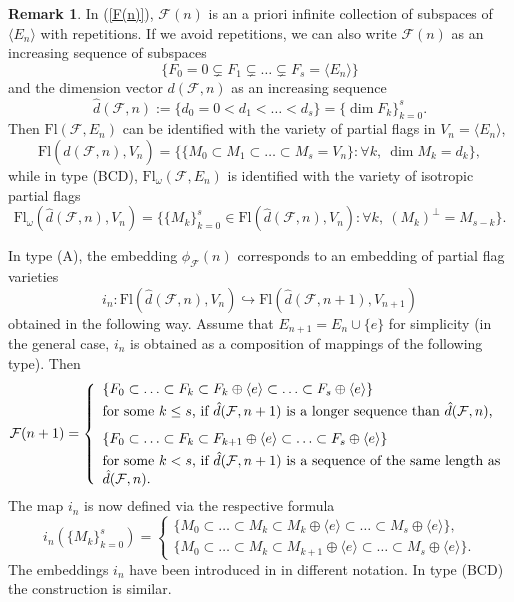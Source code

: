 \documentclass[12pt]{amsart}
\newcommand{\Ff}{\mathcal{F}}
\renewcommand{\span}[1]{\langle #1\rangle}
\newcommand{\Fl}{\mathrm{Fl}}
\numberwithin{equation}{section}
\theoremstyle{definition}
\newtheorem{remark}[theorem]{Remark}
\begin{document}
\begin{remark}
\label{R-section2.3}
In (\ref{F(n)}),
$\Ff(n)$ is an a priori infinite collection of subspaces of $\span{E_n}$ with repetitions.
If we avoid repetitions, we can also write $\Ff(n)$ as an increasing sequence of subspaces
\[
\{F_0=0\subsetneq F_1\subsetneq \ldots\subsetneq F_s=\span{E_n}\}
\]
and the dimension vector $d(\Ff,n)$ as an increasing sequence
\[
\hat{d}(\Ff,n):=\{d_0=0<d_1<\ldots<d_s\}=\{\dim F_k\}_{k=0}^s.
\]
Then $\Fl(\Ff,E_n)$ can be identified with the variety of partial flags in $V_n=\span{E_n}$,
\[
\Fl(\hat{d}(\Ff,n),V_n)=\big\{
\{M_0\subset M_1\subset \ldots\subset M_s=V_n\}:\forall k,\ \dim M_k=d_k
\big\},
\]
while in type (BCD), $\Fl_\omega(\Ff,E_n)$ is identified with the variety of 
isotropic partial flags 
\[
\Fl_\omega(\hat{d}(\Ff,n),V_n)=\big\{
\{M_k\}_{k=0}^s\in \Fl(\hat{d}(\Ff,n),V_n):\forall k,\ (M_k)^\perp=M_{s-k}
\big\}.
\]

In type (A),
the embedding $\phi_\Ff(n)$ corresponds to an embedding of partial flag varieties
\[
i_n:\Fl(\hat{d}(\Ff,n),V_n)\hookrightarrow\Fl(\hat{d}(\Ff,n+1),V_{n+1})
\]
obtained in the following way.
Assume that $E_{n+1}=E_n\cup\{e\}$ for simplicity (in the general case, $i_n$ is obtained as a composition of mappings of the following type).
Then
\[
\Ff(n+1)=\left\{
\begin{array}{l}
\{F_0\subset \ldots\subset F_k\subset F_k\oplus\span{e}\subset \ldots\subset F_s\oplus\span{e}\} \\[1mm]
\parbox{10cm}{for some $k\leq s$, if $\hat{d}(\Ff,n+1)$ is a longer sequence than $\hat{d}(\Ff,n)$,} \\[3mm]
\{F_0\subset \ldots\subset F_k\subset F_{k+1}\oplus\span{e}\subset \ldots\subset F_s\oplus\span{e}\} \\[1mm]
\parbox{10cm}{for some $k< s$, if $\hat{d}(\Ff,n+1)$ is a sequence of the same length as $\hat{d}(\Ff,n)$.}
\end{array}
\right.
\]
The map $i_n$ is now defined via the respective formula
\[
i_n(\{M_k\}_{k=0}^s)=\left\{
\begin{array}{ll}
\{M_0\subset\ldots\subset M_k\subset M_k\oplus\span{e}\subset \ldots\subset M_s\oplus\span{e}\}, \\[2mm]
\{M_0\subset\ldots\subset M_k\subset M_{k+1}\oplus\span{e}\subset\ldots\subset M_s\oplus\span{e}\}.
\end{array}
\right.
\]
The embeddings $i_n$ have been introduced in \cite{Dimitrov-Penkov} in different notation.
In type (BCD) the construction is similar.
\end{remark} 
\end{document}
